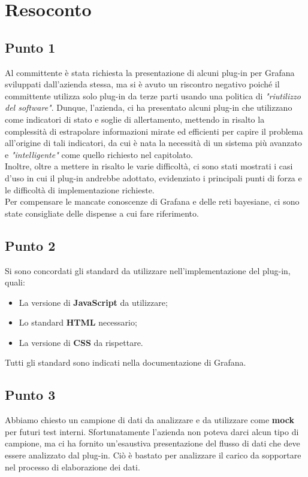 \section{Resoconto}

\subsection{Punto 1}

Al committente è stata richiesta la presentazione di alcuni plug-in  per Grafana sviluppati dall'azienda stessa, ma si è avuto un riscontro negativo poiché il committente utilizza solo plug-in da terze parti usando una politica di \textit{"riutilizzo del software"}. Dunque, l'azienda, ci ha presentato alcuni plug-in che utilizzano come indicatori di stato e soglie di allertamento, mettendo
in risalto la complessità di estrapolare informazioni mirate ed efficienti per capire il problema all'origine di tali indicatori, 
da cui è nata la necessità di un sistema più avanzato e \textit{"intelligente"} come quello richiesto nel capitolato. \\
Inoltre, oltre a mettere in risalto le varie difficoltà, ci sono stati mostrati i casi d'uso in cui il plug-in andrebbe adottato, evidenziato i principali punti di forza e le difficoltà di implementazione
richieste.\\ 
Per compensare le mancate conoscenze di Grafana e delle reti bayesiane, ci sono state consigliate delle dispense a cui fare riferimento. 

\subsection{Punto 2}
Si sono concordati gli standard da utilizzare nell'implementazione del plug-in, quali:
\begin{itemize}
	\item La versione di \textbf{JavaScript} da utilizzare; 
	\item Lo standard \textbf{HTML} necessario; 
	\item La versione di \textbf{CSS} da rispettare. 
\end{itemize}
Tutti gli standard sono indicati nella documentazione di Grafana.

\subsection{Punto 3}
Abbiamo chiesto un campione di dati da analizzare e da utilizzare come \textbf{mock} per 
futuri test interni. Sfortunatamente l'azienda non poteva darci alcun tipo di campione, ma ci ha fornito 
un'esaustiva presentazione del flusso di dati che deve essere analizzato dal plug-in.
Ciò è bastato per analizzare il carico da sopportare nel processo di elaborazione dei dati. 

